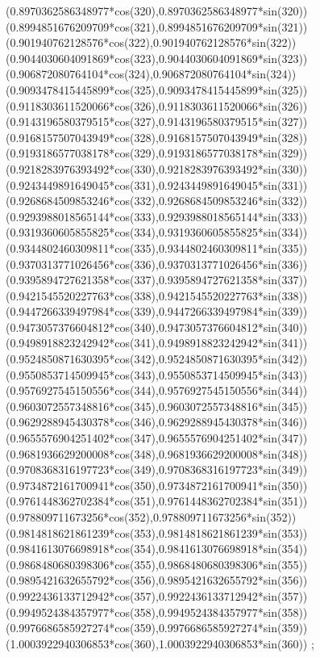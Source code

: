 {({0.8970362586348977*cos(320)},{0.8970362586348977*sin(320)})
({0.8994851676209709*cos(321)},{0.8994851676209709*sin(321)})
({0.901940762128576*cos(322)},{0.901940762128576*sin(322)})
({0.9044030604091869*cos(323)},{0.9044030604091869*sin(323)})
({0.906872080764104*cos(324)},{0.906872080764104*sin(324)})
({0.9093478415445899*cos(325)},{0.9093478415445899*sin(325)})
({0.9118303611520066*cos(326)},{0.9118303611520066*sin(326)})
({0.9143196580379515*cos(327)},{0.9143196580379515*sin(327)})
({0.9168157507043949*cos(328)},{0.9168157507043949*sin(328)})
({0.9193186577038178*cos(329)},{0.9193186577038178*sin(329)})
({0.9218283976393492*cos(330)},{0.9218283976393492*sin(330)})
({0.9243449891649045*cos(331)},{0.9243449891649045*sin(331)})
({0.9268684509853246*cos(332)},{0.9268684509853246*sin(332)})
({0.9293988018565144*cos(333)},{0.9293988018565144*sin(333)})
({0.9319360605855825*cos(334)},{0.9319360605855825*sin(334)})
({0.9344802460309811*cos(335)},{0.9344802460309811*sin(335)})
({0.9370313771026456*cos(336)},{0.9370313771026456*sin(336)})
({0.9395894727621358*cos(337)},{0.9395894727621358*sin(337)})
({0.9421545520227763*cos(338)},{0.9421545520227763*sin(338)})
({0.9447266339497984*cos(339)},{0.9447266339497984*sin(339)})
({0.9473057376604812*cos(340)},{0.9473057376604812*sin(340)})
({0.9498918823242942*cos(341)},{0.9498918823242942*sin(341)})
({0.9524850871630395*cos(342)},{0.9524850871630395*sin(342)})
({0.9550853714509945*cos(343)},{0.9550853714509945*sin(343)})
({0.9576927545150556*cos(344)},{0.9576927545150556*sin(344)})
({0.9603072557348816*cos(345)},{0.9603072557348816*sin(345)})
({0.9629288945430378*cos(346)},{0.9629288945430378*sin(346)})
({0.9655576904251402*cos(347)},{0.9655576904251402*sin(347)})
({0.9681936629200008*cos(348)},{0.9681936629200008*sin(348)})
({0.9708368316197723*cos(349)},{0.9708368316197723*sin(349)})
({0.9734872161700941*cos(350)},{0.9734872161700941*sin(350)})
({0.9761448362702384*cos(351)},{0.9761448362702384*sin(351)})
({0.978809711673256*cos(352)},{0.978809711673256*sin(352)})
({0.9814818621861239*cos(353)},{0.9814818621861239*sin(353)})
({0.9841613076698918*cos(354)},{0.9841613076698918*sin(354)})
({0.9868480680398306*cos(355)},{0.9868480680398306*sin(355)})
({0.9895421632655792*cos(356)},{0.9895421632655792*sin(356)})
({0.9922436133712942*cos(357)},{0.9922436133712942*sin(357)})
({0.9949524384357977*cos(358)},{0.9949524384357977*sin(358)})
({0.9976686585927274*cos(359)},{0.9976686585927274*sin(359)})
({1.0003922940306853*cos(360)},{1.0003922940306853*sin(360)})
};
